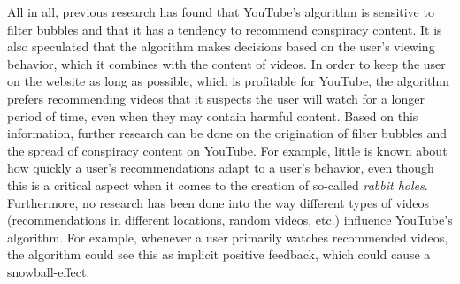 \documentclass[../main.tex]{subfiles}
\begin{document}
All in all, previous research has found that YouTube's algorithm is sensitive to filter bubbles and that
it has a tendency to recommend conspiracy content. It is also speculated that the algorithm makes
decisions based on the user's viewing behavior, which it combines with the content of videos. In order
to keep the user on the website as long as possible, which is profitable for YouTube, the algorithm
prefers recommending videos that it suspects the user will watch for a longer period of time, even when
they may contain harmful content. Based on this information, further research can be done on the
origination of filter bubbles and the spread of conspiracy content on YouTube. For example, little is
known about how quickly a user's recommendations adapt to a user's behavior, even though this is a
critical aspect when it comes to the creation of so-called \textit{rabbit holes}. Furthermore, no
research has been done into the way different types of videos (recommendations in different locations,
random videos, etc.) influence YouTube's algorithm. For example, whenever a user primarily watches
recommended videos, the algorithm could see this as implicit positive feedback, which could cause a
snowball-effect. 
\end{document}
